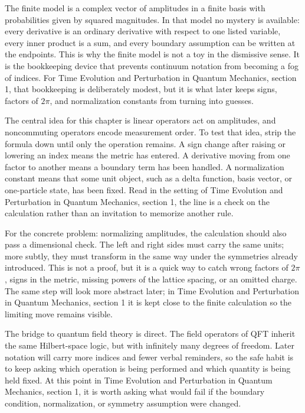 The finite model is a complex vector of amplitudes in a finite basis with probabilities given by squared magnitudes.  In that model no mystery is available: every derivative is an ordinary derivative with respect to one listed variable, every inner product is a sum, and every boundary assumption can be written at the endpoints.  This is why the finite model is not a toy in the dismissive sense.  It is the bookkeeping device that prevents continuum notation from becoming a fog of indices.  For Time Evolution and Perturbation in Quantum Mechanics, section 1, that bookkeeping is deliberately modest, but it is what later keeps signs, factors of \(2\pi\), and normalization constants from turning into guesses.

The central idea for this chapter is linear operators act on amplitudes, and noncommuting operators encode measurement order.  To test that idea, strip the formula down until only the operation remains.  A sign change after raising or lowering an index means the metric has entered.  A derivative moving from one factor to another means a boundary term has been handled.  A normalization constant means that some unit object, such as a delta function, basis vector, or one-particle state, has been fixed.  Read in the setting of Time Evolution and Perturbation in Quantum Mechanics, section 1, the line is a check on the calculation rather than an invitation to memorize another rule.

For the concrete problem: normalizing amplitudes, the calculation should also pass a dimensional check.  The left and right sides must carry the same units; more subtly, they must transform in the same way under the symmetries already introduced.  This is not a proof, but it is a quick way to catch wrong factors of \(2\pi\), signs in the metric, missing powers of the lattice spacing, or an omitted charge.  The same step will look more abstract later; in Time Evolution and Perturbation in Quantum Mechanics, section 1 it is kept close to the finite calculation so the limiting move remains visible.

The bridge to quantum field theory is direct.  The field operators of QFT inherit the same Hilbert-space logic, but with infinitely many degrees of freedom.  Later notation will carry more indices and fewer verbal reminders, so the safe habit is to keep asking which operation is being performed and which quantity is being held fixed.  At this point in Time Evolution and Perturbation in Quantum Mechanics, section 1, it is worth asking what would fail if the boundary condition, normalization, or symmetry assumption were changed.

